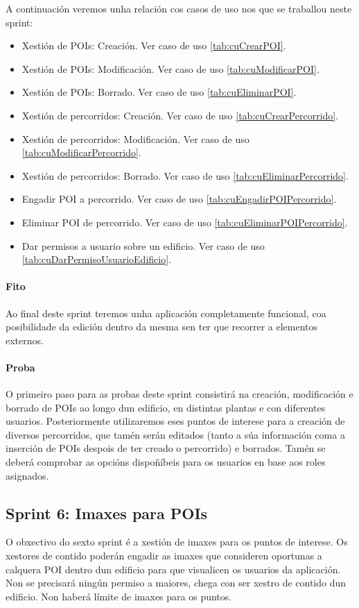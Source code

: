 A continuación veremos unha relación cos casos de uso nos que se traballou neste sprint:

\begin{itemize}
	\item Xestión de POIs: Creación. Ver caso de uso \ref{tab:cuCrearPOI}.
	\item Xestión de POIs: Modificación. Ver caso de uso \ref{tab:cuModificarPOI}.
	\item Xestión de POIs: Borrado. Ver caso de uso \ref{tab:cuEliminarPOI}.
	\item Xestión de percorridos: Creación. Ver caso de uso \ref{tab:cuCrearPercorrido}.
	\item Xestión de percorridos: Modificación. Ver caso de uso \ref{tab:cuModificarPercorrido}.
	\item Xestión de percorridos: Borrado. Ver caso de uso \ref{tab:cuEliminarPercorrido}.
	\item Engadir POI a percorrido. Ver caso de uso \ref{tab:cuEngadirPOIPercorrido}.
	\item Eliminar POI de percorrido. Ver caso de uso \ref{tab:cuEliminarPOIPercorrido}.
	\item Dar permisos a usuario sobre un edificio. Ver caso de uso \ref{tab:cuDarPermisoUsuarioEdificio}.
\end{itemize}

\paragraph{Fito}
Ao final deste sprint teremos unha aplicación completamente funcional, coa posibilidade da edición dentro da mesma sen ter que recorrer a elementos externos.

\paragraph{Proba}
O primeiro paso para as probas deste sprint consistirá na creación, modificación e borrado de POIs ao longo dun edificio, en distintas plantas e con diferentes usuarios. Posteriormente utilizaremos eses puntos de interese para a creación de diversos percorridos, que tamén serán editados (tanto a súa información coma a inserción de POIs despois de ter creado o percorrido) e borrados. Tamén se deberá comprobar as opcións dispoñíbeis para os usuarios en base aos roles asignados.


\subsection{Sprint 6: Imaxes para POIs}
O obxectivo do sexto sprint é a xestión de imaxes para os puntos de interese. Os xestores de contido poderán engadir as imaxes que consideren oportunas a calquera POI dentro dun edificio para que visualicen os usuarios da aplicación. Non se precisará ningún permiso a maiores, chega con ser xestro de contido dun edificio. Non haberá límite de imaxes para os puntos.

